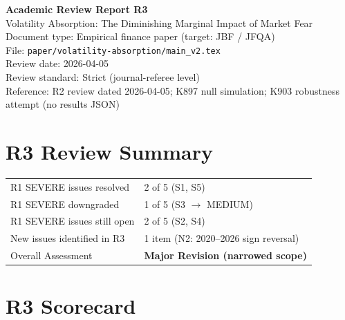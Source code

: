 \documentclass[12pt,a4paper]{article}
\begin{document}
\begin{center}
{\Large\bfseries Academic Review Report R3}\\[0.5em]
{\large Volatility Absorption: The Diminishing Marginal Impact of Market Fear}\\[0.5em]
{\normalsize Document type: Empirical finance paper (target: JBF / JFQA)}\\
{\normalsize File: \texttt{paper/volatility-absorption/main\_v2.tex}}\\
{\normalsize Review date: 2026-04-05}\\
{\normalsize Review standard: Strict (journal-referee level)}\\
{\normalsize Reference: R2 review dated 2026-04-05; K897 null simulation; K903 robustness attempt (no results JSON)}
\end{center}

\bigskip

\section*{R3 Review Summary}

\begin{tabular}{ll}
\textcolor{okgreen}{R1 SEVERE issues resolved} & 2 of 5 (S1, S5) \\
\textcolor{resolved}{R1 SEVERE downgraded} & 1 of 5 (S3 $\to$ MEDIUM) \\
\textcolor{errorred}{R1 SEVERE issues still open} & 2 of 5 (S2, S4) \\
\textcolor{warncolor}{New issues identified in R3} & 1 item (N2: 2020--2026 sign reversal) \\
Overall Assessment & \textbf{Major Revision (narrowed scope)} \\
\end{tabular}

\bigskip

\section*{R3 Scorecard}
\end{document}
